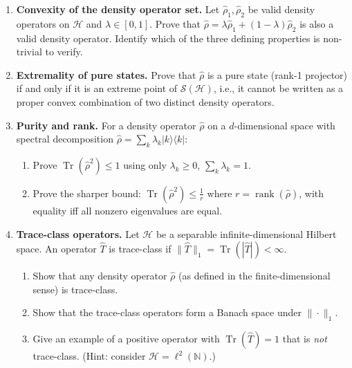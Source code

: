 \documentclass[11pt,a4paper]{article}
\begin{document}
\begin{tcolorbox}[gradprobbox, title={Part A --- Structural Proofs \hfill\normalfont 4 problems}]

\begin{enumerate}[leftmargin=1.8em, label=\textbf{A\arabic*.}, itemsep=12pt]

\item {}
  \textbf{Convexity of the density operator set.}
  Let $\hat{\rho}_1,\hat{\rho}_2$ be valid density operators on $\mathcal{H}$
  and $\lambda\in[0,1]$.
  Prove that $\hat{\rho}=\lambda\hat{\rho}_1+(1-\lambda)\hat{\rho}_2$
  is also a valid density operator. Identify which of the three defining
  properties is non-trivial to verify.

\item {}
  \textbf{Extremality of pure states.}
  Prove that $\hat{\rho}$ is a pure state (rank-1 projector) if and only if it
  is an extreme point of $\mathcal{S}(\mathcal{H})$, i.e., it cannot be written
  as a proper convex combination of two distinct density operators.

\item {}
  \textbf{Purity and rank.}
  For a density operator $\hat{\rho}$ on a $d$-dimensional space with
  spectral decomposition $\hat{\rho}=\sum_k\lambda_k|k\rangle\langle k|$:
  \begin{enumerate}[label=(\alph*)]
    \item Prove $\operatorname{Tr}(\hat{\rho}^2)\le 1$ using only $\lambda_k\ge 0$, $\sum_k\lambda_k=1$.
    \item Prove the sharper bound: $\operatorname{Tr}(\hat{\rho}^2)\le\tfrac{1}{r}$ where
          $r=\operatorname{rank}(\hat{\rho})$, with equality iff all nonzero eigenvalues are equal.
  \end{enumerate}

\item {}
  \textbf{Trace-class operators.}
  Let $\mathcal{H}$ be a separable infinite-dimensional Hilbert space.
  An operator $\hat{T}$ is trace-class if
  $\|\hat{T}\|_1=\operatorname{Tr}(|\hat{T}|)<\infty$.
  \begin{enumerate}[label=(\alph*)]
    \item Show that any density operator $\hat{\rho}$ (as defined in the finite-dimensional
          sense) is trace-class.
    \item Show that the trace-class operators form a Banach space under $\|\cdot\|_1$.
    \item Give an example of a positive operator with $\operatorname{Tr}(\hat{T})=1$ that
          is \emph{not} trace-class. (Hint: consider $\mathcal{H}=\ell^2(\mathbb{N})$.)
  \end{enumerate}

\end{enumerate}
\end{tcolorbox}
\end{document}
